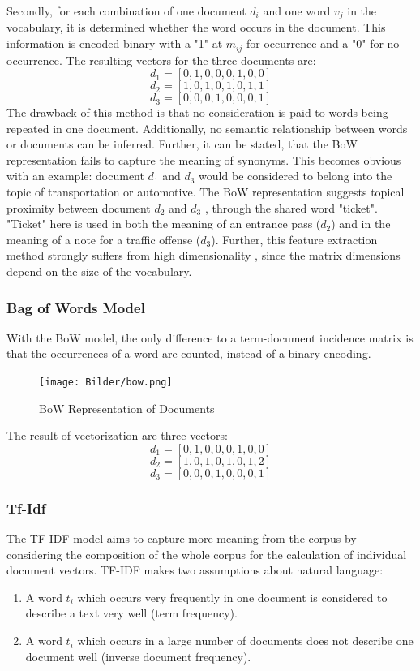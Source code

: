             Secondly, for each combination of one document $ d_{i} $ and one word $ v_{j} $ in the vocabulary, it is determined whether the word occurs in the document. This information is encoded binary with a "1" at $m_{ij}$ for occurrence and a "0" for no occurrence. The resulting vectors for the three documents are:
            \[ d_{1} = [0,1,0,0,0,1,0,0] \]
            \[ d_{2} = [1,0,1,0,1,0,1,1] \]
            \[ d_{3} = [0,0,0,1,0,0,0,1]\]
    		The drawback of this method is that no consideration is paid to words being repeated in one document. Additionally, no semantic relationship between words or documents can be inferred. 
    		Further, it can be stated, that the \ac{BoW} representation fails to capture the meaning of synonyms. This becomes obvious with an example: document $ d_{1} $ and $ d_{3}$ would be considered to belong into the topic of transportation or automotive. The \ac{BoW} representation suggests topical proximity between document $ d_{2} $ and $ d_{3}$ , through the shared word "ticket". "Ticket" here is used in both the meaning of an entrance pass ($d_{2}$) and in the meaning of a note for a traffic offense  ($d_{3}$). 
    		Further, this feature extraction method strongly suffers from high dimensionality \cite{practicalNLP}, since the matrix dimensions depend on the size of the vocabulary. 
    
            \subsubsection{Bag of Words Model}
 			With the \ac{BoW} model, the only difference to a term-document incidence matrix is that the occurrences of a word are counted, instead of a binary encoding.
             \begin{figure}[ht]
            	\centering
            	\texttt{[image: Bilder/bow.png]}
            	\caption{\acl{BoW} Representation of Documents}
            	\label{fig:corpus}
            \end{figure}
            
            The result of vectorization are three vectors:
            \[ d_{1} = [0,1,0,0,0,1,0,0] \]
            \[ d_{2} = [1,0,1,0,1,0,1,2] \]	
            \[ d_{3} = [0,0,0,1,0,0,0,1]\]
            
            \subsubsection{Tf-Idf}
            \label{section:tfidf}
            The \ac{TF-IDF} model aims to capture more meaning from the corpus by considering the composition of the whole corpus for the calculation of individual document vectors. \ac{TF-IDF} makes two assumptions about natural language:
            \begin{enumerate}
            	\item A word $t_{i} $ which occurs very frequently in one document is considered to describe a text very well (term frequency).
            	\item A word $t_{i} $ which occurs in a large number of documents does not describe one document well (inverse document frequency).
            \end{enumerate}
            
